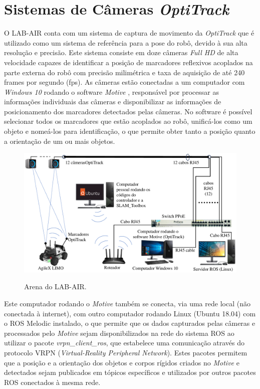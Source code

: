 \section{Sistemas de Câmeras \textit{OptiTrack}}
\label{sec:Sistema_Optitrack}

    O LAB-AIR conta com um sistema de captura de movimento da \textit{OptiTrack} que é utilizado como um sistema de referência para a pose do robô, devido à sua alta resolução e precisão. Este sistema consiste em doze câmeras \textit{Full HD} de alta velocidade capazes de identificar a posição de marcadores reflexivos acoplados na parte externa do robô com precisão milimétrica e taxa de aquisição de até 240 frames por segundo (fps). As câmeras estão conectadas a um computador com \textit{Windows 10} rodando o software \textit{Motive} \cite{site:OptiTrack_Motive}, responsável por processar as informações individuais das câmeras e disponibilizar as informações de posicionamento dos marcadores detectados pelas câmeras. No software é possível selecionar todos os marcadores que estão acoplados ao robô, unificá-los como um objeto e nomeá-los para identificação, o que permite obter tanto a posição quanto a orientação de um ou mais objetos.
    
    \begin{figure}[htb]
         \centering
         \caption{Arena do LAB-AIR.}
         \includegraphics[width=\linewidth]{img/OptitrackArenaTCC_Mauricio.pdf}
         \source
         \label{fig:ArenaLAB-AIR}
     \end{figure}
    
    Este computador rodando o \textit{Motive} também se conecta, via uma rede local (não conectada à internet), com outro computador rodando Linux (Ubuntu 18.04) com o ROS Melodic instalado, o que permite que os dados capturados pelas câmeras e processados pelo \textit{Motive} sejam disponibilizados na rede do sistema ROS ao utilizar o pacote \textit{vrpn\_client\_ros}, que estabelece uma comunicação através do protocolo VRPN (\textit{Virtual-Reality Peripheral Network}). Estes pacotes permitem que a posição e a orientação dos objetos e corpos rígidos criados no \textit{Motive} e detectados sejam publicados em tópicos específicos e utilizados por outros pacotes ROS conectados à mesma rede.


